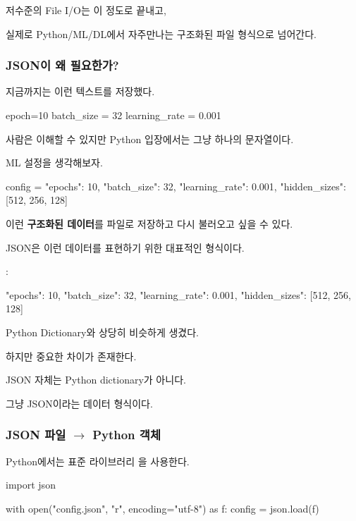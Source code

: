 저수준의 File I/O는 이 정도로 끝내고,

실제로 Python/ML/DL에서 자주만나는 구조화된 파일 형식으로 넘어간다.

\subsubsection{JSON이 왜 필요한가?}

지금까지는 이런 텍스트를 저장했다.

\begin{dhkzsh}
epoch=10
batch_size = 32
learning_rate = 0.001
\end{dhkzsh}

사람은 이해할 수 있지만 Python 입장에서는 그냥 하나의 문자열이다.

ML 설정을 생각해보자.

\begin{dhkzsh}
config = {
    "epochs": 10,
    "batch_size": 32,
    "learning_rate": 0.001,
    "hidden_sizes": [512, 256, 128]
}
\end{dhkzsh}

이런 \textbf{구조화된 데이터}를 파일로 저장하고 다시 불러오고 싶을 수 있다.

JSON은 이런 데이터를 표현하기 위한 대표적인 형식이다.

:

\begin{dhkzsh}
{
    "epochs": 10,
    "batch_size": 32,
    "learning_rate": 0.001,
    "hidden_sizes": [512, 256, 128]
}
\end{dhkzsh}

Python Dictionary와 상당히 비슷하게 생겼다.

하지만 중요한 차이가 존재한다.

\begin{dhknote}
\begin{dhksmry}[centered]
JSON 자체는 Python dictionary가 아니다.
\end{dhksmry}
\end{dhknote}

그냥 JSON이라는 데이터 형식이다.

\subsubsection{JSON 파일 $\rightarrow$ Python 객체}

Python에서는 표준 라이브러리 을 사용한다.

\begin{dhkcode}
import json

with open("config.json", "r", encoding="utf-8") as f:
    config = json.load(f)
\end{dhkcode}

